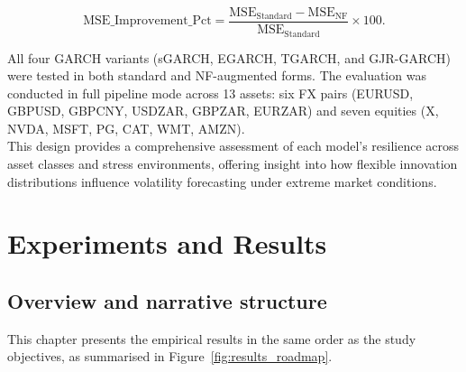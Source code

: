 \documentclass[oneside,12pt]{CUEDthesisPSnPDF}
\begin{document}
\medskip
\[
\text{MSE\_Improvement\_Pct} = \frac{\text{MSE}_{\text{Standard}} - \text{MSE}_{\text{NF}}}{\text{MSE}_{\text{Standard}}} \times 100.
\]
\vspace{8pt}

All four GARCH variants (sGARCH, EGARCH, TGARCH, and GJR-GARCH) were tested in both standard and NF-augmented forms. The evaluation was conducted in full pipeline mode across 13 assets: six FX pairs (EURUSD, GBPUSD, GBPCNY, USDZAR, GBPZAR, EURZAR) and seven equities (X, NVDA, MSFT, PG, CAT, WMT, AMZN).\\

This design provides a comprehensive assessment of each model’s resilience across asset classes and stress environments, offering insight into how flexible innovation distributions influence volatility forecasting under extreme market conditions.\\


\chapter{Experiments and Results}
\label{ch:results} 

\section{Overview and narrative structure}
\noindent
This chapter presents the empirical results in the same order as the study objectives, as summarised in Figure~\ref{fig:results_roadmap}.
\end{document}
